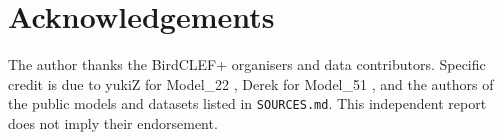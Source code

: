 \documentclass[10pt,a4paper]{article}
\begin{document}
\section*{Acknowledgements}
The author thanks the BirdCLEF+ organisers and data contributors. Specific credit is due to yukiZ for Model\_22 \cite{yukiz2026model22}, Derek for Model\_51 \cite{derek2026model51}, and the authors of the public models and datasets listed in \texttt{SOURCES.md}. This independent report does not imply their endorsement.


\end{document}
